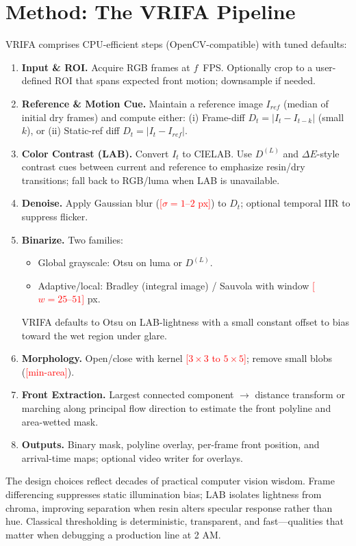 \documentclass[twocolumn, 10pt]{article}
\newcommand{\placeholder}[1]{\textcolor{red}{[#1]}}
\begin{document}
\section{Method: The VRIFA Pipeline}
VRIFA comprises CPU-efficient steps (OpenCV-compatible) with tuned defaults:
\begin{enumerate}[leftmargin=*,topsep=0pt]
  \item \textbf{Input \& ROI.} Acquire RGB frames at $f$~FPS. Optionally crop to a user-defined ROI that spans expected front motion; downsample if needed.
  \item \textbf{Reference \& Motion Cue.} Maintain a reference image $I_{ref}$ (median of initial dry frames) and compute either: (i) Frame-diff $D_t = |I_t - I_{t-k}|$ (small $k$), or (ii) Static-ref diff $D_t = |I_t - I_{ref}|$.
  \item \textbf{Color Contrast (LAB).} Convert $I_t$ to CIELAB. Use $D^{(L)}$ and $\Delta E$-style contrast cues between current and reference to emphasize resin/dry transitions; fall back to RGB/luma when LAB is unavailable.
  \item \textbf{Denoise.} Apply Gaussian blur (\placeholder{$\sigma{=}1\text{--}2$ px}) to $D_t$; optional temporal IIR to suppress flicker.
  \item \textbf{Binarize.} Two families:
    \begin{itemize}[nosep]
      \item Global grayscale: Otsu on luma or $D^{(L)}$.
      \item Adaptive/local: Bradley (integral image) / Sauvola with window \placeholder{$w{=}25\text{--}51$} px.
    \end{itemize}
    VRIFA defaults to Otsu on LAB-lightness with a small constant offset to bias toward the wet region under glare.
  \item \textbf{Morphology.} Open/close with kernel \placeholder{$3{\times}3$ to $5{\times}5$}; remove small blobs (\placeholder{min-area}).
  \item \textbf{Front Extraction.} Largest connected component $\rightarrow$ distance transform or marching along principal flow direction to estimate the front polyline and area-wetted mask. 
  \item \textbf{Outputs.} Binary mask, polyline overlay, per-frame front position, and arrival-time maps; optional video writer for overlays.
\end{enumerate}

The design choices reflect decades of practical computer vision wisdom. Frame differencing suppresses static illumination bias; LAB isolates lightness from chroma, improving separation when resin alters specular response rather than hue. Classical thresholding is deterministic, transparent, and fast—qualities that matter when debugging a production line at 2 AM.
\end{document}
